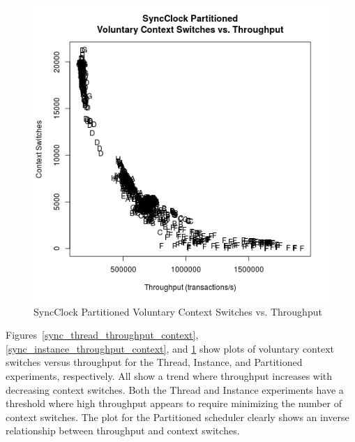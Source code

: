 \begin{figure}[H]
\center
\includegraphics[height=.4\textheight]{sync_partitioned_throughput_context.png}
\caption{SyncClock Partitioned Voluntary Context Switches vs. Throughput}
\label{sync_partitioned_throughput_context}
\end{figure}

Figures~\ref{sync_thread_throughput_context}, \ref{sync_instance_throughput_context}, and \ref{sync_partitioned_throughput_context} show plots of voluntary context switches versus throughput for the Thread, Instance, and Partitioned experiments, respectively.
All show a trend where throughput increases with decreasing context switches.
Both the Thread and Instance experiments have a threshold where high throughput appears to require minimizing the number of context switches.
The plot for the Partitioned scheduler clearly shows an inverse relationship between throughput and context switches.

